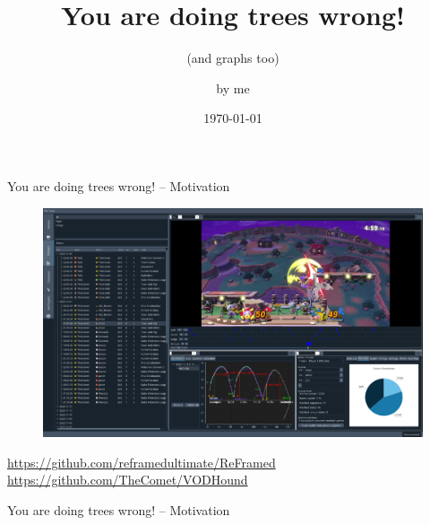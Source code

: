 \documentclass{beamer}
\title{You are doing trees wrong!}
\subtitle{(and graphs too)}
\author{by me}
\date{\today}
\begin{document}
\begin{frame}
	\titlepage
\end{frame}

\begin{frame}{You are doing trees wrong! -- Motivation}
	\begin{figure}
		\centering
		\includegraphics[width=.9\linewidth]{img/reframed.png}
	\end{figure}
	\url{https://github.com/reframedultimate/ReFramed}
	\url{https://github.com/TheComet/VODHound}
\end{frame}

\begin{frame}{You are doing trees wrong! -- Motivation}
	\begin{figure}
	\end{figure}
\end{frame}
\end{document}
